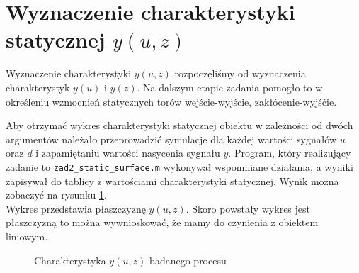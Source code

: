 \section{Wyznaczenie charakterystyki statycznej $y(u,z)$}
Wyznaczenie charakterystyki $y(u,z)$ rozpoczęliśmy od wyznaczenia charakterystyk $y(u)$ i $y(z)$. 
Na dalszym etapie zadania pomogło to w określeniu wzmocnień statycznych torów wejście-wyjście, zakłócenie-wyjśćie. 

Aby otrzymać wykres charakterystyki statycznej obiektu w zależności od 
dwóch argumentów należało przeprowadzić symulacje dla każdej 
wartości sygnałów $u$ oraz $d$ i zapamiętaniu wartości 
nasycenia sygnału $y$. Program, który realizujący zadanie to 
\verb+zad2_static_surface.m+ wykonywał wspomniane działania, 
a wyniki zapisywał do tablicy z wartościami charakterystyki statycznej. 
Wynik można zobaczyć na rysunku \ref{zad2_y_od_u_i_z}.\\
\indent{} Wykres przedstawia płaszczyznę $y(u,z)$. Skoro powstały wykres 
jest płaszczyzną to można wywnioskować, że mamy do czynienia z obiektem liniowym. 

\begin{figure}[t]
    \centering
    \caption{Charakterystyka $y(u,z)$ badanego procesu}
    \label{zad2_y_od_u_i_z}
\end{figure}